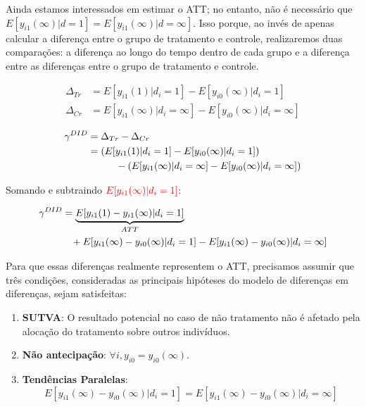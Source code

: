 \documentclass[portugues]{article}
\begin{document}
Ainda estamos interessados em estimar o ATT; no entanto, não é necessário que $E[y_{i1}(\infty)|d=1] = E[y_{i1}(\infty)|d=\infty]$. Isso porque, ao invés de apenas calcular a diferença entre o grupo de tratamento e controle, realizaremos duas comparações: a diferença ao longo do tempo dentro de cada grupo e a diferença entre as diferenças entre o grupo de tratamento e controle.

\[\begin{split}
      \Delta_{Tr}   & = E[y_{i1}(1) | d_i = 1] - E[y_{i0}(\infty) | d_i = 1] \\
       \Delta_{Cr}  & = E[y_{i1}(\infty) | d_i = \infty] - E[y_{i0}(\infty) | d_i = \infty]
\end{split}\]

\[\begin{split}
    \gamma^{DID} & = \Delta_{Tr} - \Delta_{Cr} \\
    & = \left(E[y_{i1}(1) | d_i = 1] - E[y_{i0}(\infty) | d_i = 1]\right) \\
    & \hspace{10mm}- ( E[y_{i1}(\infty) | d_i = \infty] - E[y_{i0}(\infty) | d_i = \infty])\\
\end{split}\]

Somando e subtraindo  $\textcolor{red}{E[y_{i1}(\infty) | d_i = 1]}$:

\begin{equation}\label{eq:didef}
    \begin{split}
     \gamma^{DID} & = \underbrace{E[y_{i1}(1) - y_{i1}(\infty) | d_i = 1]}_{ATT} \\
     & \hspace{3mm}+ E[y_{i1}(\infty) - y_{i0}(\infty) | d_i = 1] - E[y_{i1}(\infty) - y_{i0}(\infty) | d_i = \infty]
\end{split}
\end{equation}

Para que essas diferenças realmente representem o ATT, precisamos assumir que três condições, consideradas as principais hipóteses do modelo de diferenças em diferenças, sejam satisfeitas:

\begin{boxB}
\begin{enumerate}
    \item \textbf{SUTVA}: O resultado potencial no caso de não tratamento não é afetado pela alocação do tratamento sobre outros indivíduos.
    \item \textbf{Não antecipação}: $\forall i,  y_{i0} = y_{i0}(\infty)$.
    \item \textbf{Tendências Paralelas}: 
    $$ E[y_{i1}(\infty) - y_{i0}(\infty) | d_i = 1] = E[y_{i1}(\infty) - y_{i0}(\infty) | d_i = \infty] $$
\end{enumerate}
\end{boxB}
\end{document}
